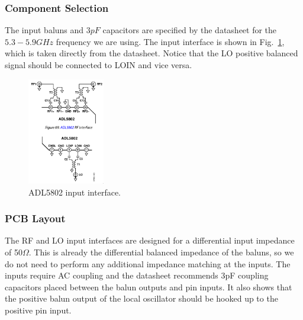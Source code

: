 \subsubsection{Component Selection}
\label{sec:adl5802-component-selection}

The input baluns and $3 \si{pF}$ capacitors are specified by the datasheet for the $5.3 - 5.9
\si{GHz}$ frequency we are using. The input interface is shown in
Fig.~\ref{fig:adl5802-input-interface}, which is taken directly from the datasheet. Notice that the
LO positive balanced signal should be connected to LOIN and vice versa.

\begin{figure}[h]
        \centering
        \includegraphics[width=0.3\textwidth]{data/adl5802-input-interface}
        \caption{ADL5802 input interface.}
        \label{fig:adl5802-input-interface}
\end{figure}

\subsubsection{PCB Layout}
\label{sec:adl5802-pcb-layout}



The RF and LO input interfaces are designed for a differential input impedance of 50$\Omega$. This
is already the differential balanced impedance of the baluns, so we do not need to perform any
additional impedance matching at the inputs. The inputs require AC coupling and the datasheet
recommends 3pF coupling capacitors placed between the balun outputs and pin inputs. It also shows
that the positive balun output of the local oscillator should be hooked up to the positive pin
input.

